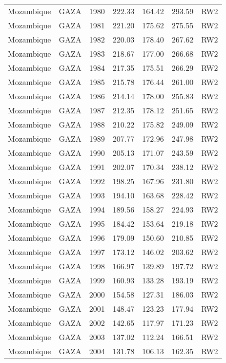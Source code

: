 \begin{longtable}{lllrrrl}
  Mozambique & GAZA & 1980 & 222.33 & 164.42 & 293.59 & RW2 \\ 
  Mozambique & GAZA & 1981 & 221.20 & 175.62 & 275.55 & RW2 \\ 
  Mozambique & GAZA & 1982 & 220.03 & 178.40 & 267.62 & RW2 \\ 
  Mozambique & GAZA & 1983 & 218.67 & 177.00 & 266.68 & RW2 \\ 
  Mozambique & GAZA & 1984 & 217.35 & 175.51 & 266.29 & RW2 \\ 
  Mozambique & GAZA & 1985 & 215.78 & 176.44 & 261.00 & RW2 \\ 
  Mozambique & GAZA & 1986 & 214.14 & 178.00 & 255.83 & RW2 \\ 
  Mozambique & GAZA & 1987 & 212.35 & 178.12 & 251.65 & RW2 \\ 
  Mozambique & GAZA & 1988 & 210.22 & 175.82 & 249.09 & RW2 \\ 
  Mozambique & GAZA & 1989 & 207.77 & 172.96 & 247.98 & RW2 \\ 
  Mozambique & GAZA & 1990 & 205.13 & 171.07 & 243.59 & RW2 \\ 
  Mozambique & GAZA & 1991 & 202.07 & 170.34 & 238.12 & RW2 \\ 
  Mozambique & GAZA & 1992 & 198.25 & 167.96 & 231.80 & RW2 \\ 
  Mozambique & GAZA & 1993 & 194.10 & 163.68 & 228.42 & RW2 \\ 
  Mozambique & GAZA & 1994 & 189.56 & 158.27 & 224.93 & RW2 \\ 
  Mozambique & GAZA & 1995 & 184.42 & 153.64 & 219.18 & RW2 \\ 
  Mozambique & GAZA & 1996 & 179.09 & 150.60 & 210.85 & RW2 \\ 
  Mozambique & GAZA & 1997 & 173.12 & 146.02 & 203.62 & RW2 \\ 
  Mozambique & GAZA & 1998 & 166.97 & 139.89 & 197.72 & RW2 \\ 
  Mozambique & GAZA & 1999 & 160.93 & 133.28 & 193.19 & RW2 \\ 
  Mozambique & GAZA & 2000 & 154.58 & 127.31 & 186.03 & RW2 \\ 
  Mozambique & GAZA & 2001 & 148.47 & 123.23 & 177.94 & RW2 \\ 
  Mozambique & GAZA & 2002 & 142.65 & 117.97 & 171.23 & RW2 \\ 
  Mozambique & GAZA & 2003 & 137.02 & 112.24 & 166.51 & RW2 \\ 
  Mozambique & GAZA & 2004 & 131.78 & 106.13 & 162.35 & RW2 \\ 

\end{longtable}
